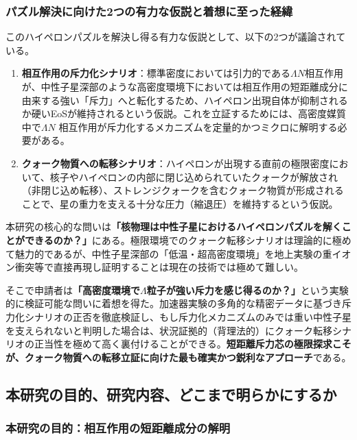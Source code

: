 \documentclass[11pt,a4j,dvipdfmx]{jarticle} 					%
\newcommand{\研究課題名}{加速器実験による短距離バリオン間相互作用の解明と中性子星ハイペロンパズルの解決}
\newcommand{\研究機関名}{東北大学}
\newcommand{\研究代表者氏名}{市川裕大}
\newcommand{\研究期間の最終元号年度}{13}
\begin{document}
\subsubsection{パズル解決に向けた2つの有力な仮説と着想に至った経緯}
このハイペロンパズルを解決し得る有力な仮説として、以下の2つが議論されている。
\begin{enumerate}
    \item \textbf{相互作用の斥力化シナリオ}：標準密度においては引力的である$\Lambda N$相互作用が、中性子星深部のような高密度環境下においては相互作用の短距離成分に由来する強い「斥力」へと転化するため、ハイペロン出現自体が抑制されるか硬いEoSが維持されるという仮説。これを立証するためには、高密度媒質中で$\Lambda N$ 相互作用が斥力化するメカニズムを定量的かつミクロに解明する必要がある。
    \item \textbf{クォーク物質への転移シナリオ}：ハイペロンが出現する直前の極限密度において、核子やハイペロンの内部に閉じ込められていたクォークが解放され（非閉じ込め転移）、ストレンジクォークを含むクォーク物質が形成されることで、星の重力を支える十分な圧力（縮退圧）を維持するという仮説。
\end{enumerate}

本研究の核心的な問いは\textbf{「核物理は中性子星におけるハイペロンパズルを解くことができるのか？」}にある。極限環境でのクォーク転移シナリオは理論的に極めて魅力的であるが、中性子星深部の「低温・超高密度環境」を地上実験の重イオン衝突等で直接再現し証明することは現在の技術では極めて難しい。

そこで申請者は\textbf{「高密度環境で$\Lambda$粒子が強い斥力を感じ得るのか？」}という実験的に検証可能な問いに着想を得た。加速器実験の多角的な精密データに基づき斥力化シナリオの正否を徹底検証し、もし斥力化メカニズムのみでは重い中性子星を支えられないと判明した場合は、状況証拠的（背理法的）にクォーク転移シナリオの正当性を極めて高く裏付けることができる。\textbf{短距離斥力芯の極限探求こそが、クォーク物質への転移立証に向けた最も確実かつ鋭利なアプローチ}である。

\subsection{本研究の目的、研究内容、どこまで明らかにするか}


\subsubsection{本研究の目的：相互作用の短距離成分の解明}
\end{document}
